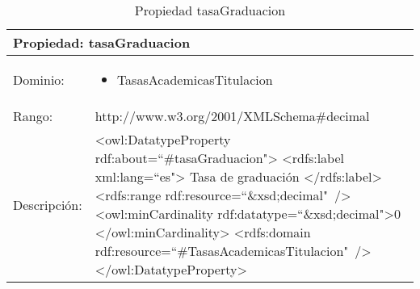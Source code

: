 \begin{table}[!ht]
	\centering
	\begin{tabular}{|p{}|p{}|}
		\hline
		\multicolumn{2}{|l|}{Propiedad: \textbf{tasaGraduacion}}
		\\ \hline
		Dominio:&
		\begin{itemize}
			\item TasasAcademicasTitulacion
		\end{itemize}
		\\ \hline
		Rango:&
		http://www.w3.org/2001/XMLSchema\#decimal
		\\ \hline
		Descripción:&
		\textless owl:DatatypeProperty rdf:about=``\#tasaGraduacion"\textgreater\newline 
		\tab\textless rdfs:label xml:lang=``es"\textgreater\newline
		\tab\tab Tasa de graduación\newline
		\tab\textless /rdfs:label\textgreater\newline
		\tab\textless rdfs:range\newline
		\tab\tab rdf:resource=``\&xsd;decimal"\ /\textgreater\newline
		\tab\textless owl:minCardinality \newline
		\tab\tab rdf:datatype=``\&xsd;decimal"\textgreater0\newline
		\tab\textless /owl:minCardinality\textgreater\newline
		\tab\textless rdfs:domain\newline
		\tab\tab rdf:resource=``\#TasasAcademicasTitulacion"\ /\textgreater\newline
		\textless /owl:DatatypeProperty\textgreater
		\\ \hline
	\end{tabular}
	\caption{Propiedad tasaGraduacion}
	\label{propiedad-tasagraduacion}
\end{table}

